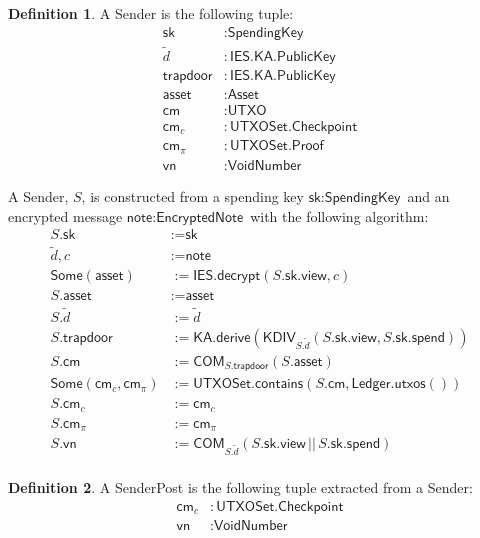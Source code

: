 \documentclass[a4paper]{article}
\theoremstyle{definition}
\newtheorem{definition}{Definition}[subsection]
\newcommand{\Asset}{{\textsf{Asset}}}
\newcommand{\COM}{{\textsf{COM}}}
\newcommand{\Checkpoint}{{\textsf{Checkpoint}}}
\newcommand{\EncryptedNote}{{\textsf{EncryptedNote}}}
\newcommand{\IES}{{\textsf{IES}}}
\newcommand{\KA}{{\textsf{KA}}}
\newcommand{\KDIV}{{\textsf{KDIV}}}
\newcommand{\Ledger}{{\textsf{Ledger}}}
\newcommand{\Proof}{{\textsf{Proof}}}
\newcommand{\PublicKey}{{\textsf{PublicKey}}}
\newcommand{\SenderPost}{{\textsf{SenderPost}}}
\newcommand{\Sender}{{\textsf{Sender}}}
\newcommand{\Some}{{\textsf{Some}}}
\newcommand{\SpendingKey}{{\textsf{SpendingKey}}}
\newcommand{\UTXOSet}{{\textsf{UTXOSet}}}
\newcommand{\UTXO}{{\textsf{UTXO}}}
\newcommand{\VoidNumber}{{\textsf{VoidNumber}}}
\newcommand{\asset}{{\textsf{asset}}}
\newcommand{\cm}{{\textsf{cm}}}
\newcommand{\contains}{{\textsf{contains}}}
\newcommand{\decrypt}{{\textsf{decrypt}}}
\newcommand{\derive}{{\textsf{derive}}}
\newcommand{\note}{{\textsf{note}}}
\newcommand{\sk}{{\textsf{sk}}}
\newcommand{\spend}{{\textsf{spend}}}
\newcommand{\trapdoor}{{\textsf{trapdoor}}}
\newcommand{\utxos}{{\textsf{utxos}}}
\newcommand{\view}{{\textsf{view}}}
\newcommand{\vn}{{\textsf{vn}}}
\begin{document}
\begin{definition}
    A \Sender{} is the following tuple:
    \begin{align*}
        \sk       &: \SpendingKey \\
        \tilde{d} &: \IES.\KA.\PublicKey \\
        \trapdoor &: \IES.\KA.\PublicKey \\
        \asset    &: \Asset \\
        \cm       &: \UTXO \\
        \cm_c     &: \UTXOSet.\Checkpoint \\
        \cm_\pi   &: \UTXOSet.\Proof \\
        \vn       &: \VoidNumber
    \end{align*}

    A \Sender{}, $S$, is constructed from a spending key $\sk : \SpendingKey$ and an encrypted message $\note : \EncryptedNote$ with the following algorithm:
    \begin{align*}
        S.\sk                 &:= \sk \\
        \tilde{d}, c          &:= \note \\
        \Some(\asset)         &:= \IES.\decrypt(S.\sk.\view, c) \\
        S.\asset              &:= \asset \\
        S.\tilde{d}           &:= \tilde{d} \\
        S.\trapdoor           &:= \KA.\derive(\KDIV_{S.\tilde{d}}(S.\sk.\view, S.\sk.\spend)) \\
        S.\cm                 &:= \COM_{S.\trapdoor}(S.\asset) \\
        \Some(\cm_c, \cm_\pi) &:= \UTXOSet.\contains(S.\cm, \Ledger.\utxos()) \\
        S.\cm_c               &:= \cm_c \\
        S.\cm_\pi             &:= \cm_\pi \\
        S.\vn                 &:= \COM_{S.\tilde{d}}(S.\sk.\view \,||\, S.\sk.\spend) \\
    \end{align*}
\end{definition}

\begin{definition}
    A \SenderPost{} is the following tuple extracted from a \Sender{}:
    \begin{align*}
        \cm_c &: \UTXOSet.\Checkpoint \\
        \vn   &: \VoidNumber
    \end{align*}
\end{definition}
\end{document}
